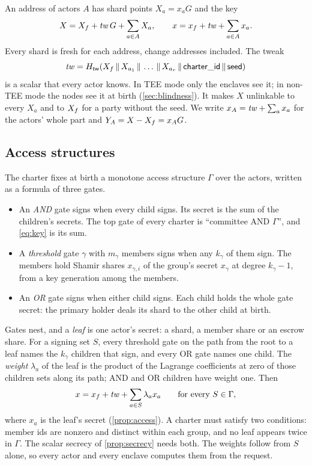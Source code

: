 An address of actors $A$ has shard points $X_a = x_a G$ and the key
\begin{equation}\label{eq:key}
  X = X_{f} + \mathit{tw}\,G + \sum_{a \in A} X_a, \qquad x = x_{f} + \mathit{tw} + \sum_{a \in A} x_a .
\end{equation}
Every shard is fresh for each address, change addresses included. The tweak
\[
  \mathit{tw} = H_{\mathsf{tw}}(X_{f} \,\|\, X_{a_1} \,\|\, \dots \,\|\, X_{a_r} \,\|\, \mathsf{charter\_id} \,\|\, \mathsf{seed})
\]
is a scalar that every actor knows. In TEE mode only the enclaves see it; in non-TEE mode the nodes see it at birth (\cref{sec:blindness}). It makes $X$ unlinkable to every $X_a$ and to $X_{f}$ for a party without the seed. We write $x_A = \mathit{tw} + \sum_a x_a$ for the actors' whole part and $Y_A = X - X_{f} = x_A G$.

\subsection{Access structures}\label{sec:access}

The charter fixes at birth a monotone access structure $\Gamma$ over the actors, written as a formula of three gates.
\begin{itemize}[leftmargin=1.5em]
\item An \emph{AND} gate signs when every child signs. Its secret is the sum of the children's secrets. The top gate of every charter is ``committee AND $\Gamma$'', and \eqref{eq:key} is its sum.
\item A \emph{threshold} gate $\gamma$ with $m_\gamma$ members signs when any $k_\gamma$ of them sign. The members hold Shamir shares $x_{\gamma,i}$ of the group's secret $x_\gamma$ at degree $k_\gamma - 1$, from a key generation among the members.
\item An \emph{OR} gate signs when either child signs. Each child holds the whole gate secret: the primary holder deals its shard to the other child at birth.
\end{itemize}
Gates nest, and a \emph{leaf} is one actor's secret: a shard, a member share or an escrow share. For a signing set $S$, every threshold gate on the path from the root to a leaf names the $k_\gamma$ children that sign, and every OR gate names one child. The \emph{weight} $\lambda_a$ of the leaf is the product of the Lagrange coefficients at zero of those children sets along its path; AND and OR children have weight one. Then
\begin{equation}\label{eq:weighted}
  x = x_{f} + \mathit{tw} + \sum_{a \in S} \lambda_a x_a \qquad\text{for every } S \in \Gamma ,
\end{equation}
where $x_a$ is the leaf's secret (\cref{prop:access}). A charter must satisfy two conditions: member ids are nonzero and distinct within each group, and no leaf appears twice in $\Gamma$. The scalar secrecy of \cref{prop:secrecy} needs both. The weights follow from $S$ alone, so every actor and every enclave computes them from the request.

